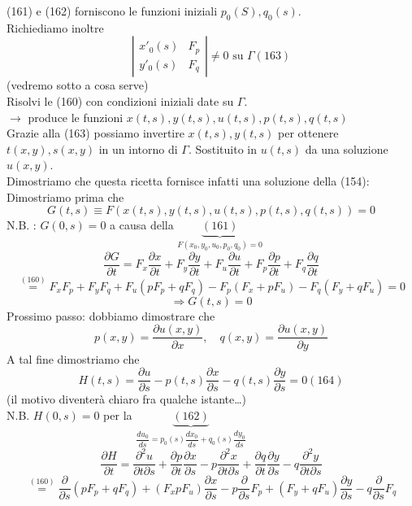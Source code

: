\documentclass[a4paper,11pt]{report}
\begin{document}
(161) e (162) forniscono le funzioni iniziali $p_0(S), q_0(s)$.\\
Richiediamo inoltre
\begin{equation}
\left| \begin{matrix}
x'_0(s) & F_p\\
y'_0(s) & F_q
\end{matrix}\right| \neq 0 \text{ su } \Gamma (163)
\end{equation}
(vedremo sotto a cosa serve)\\
Risolvi le (160) con condizioni iniziali date su $\Gamma$.\\
$\rightarrow$ produce le funzioni $x(t,s), y(t,s), u(t,s), p(t,s), q(t,s)$\\
Grazie alla (163) possiamo invertire $x(t,s), y(t,s)$ per ottenere $t(x,y), s(x,y)$ in un intorno di $\Gamma$. Sostituito in $u(t,s)$ da una soluzione $u(x,y)$.\\
Dimostriamo che questa ricetta fornisce infatti una soluzione della (154):\\
Dimostriamo prima che 
$$
G(t,s) \equiv F(x(t,s),y(t,s),u(t,s),p(t,s),q(t,s))=0
$$
N.B. : $G(0,s)=0$ a causa della $\underset{F(x_0,y_0,u_0,p_0,q_0)=0}{\underbrace{(161)}}$
$$
\dfrac{\partial G}{\partial t} = F_x \dfrac{\partial x}{\partial t} + F_y \dfrac{\partial y}{\partial t} + F_u \dfrac{\partial u}{\partial t} + F_p \dfrac{\partial p}{\partial t} + F_q \dfrac{\partial q}{\partial t}
$$
$$
\overset{(160)}{=}F_xF_p + F_y F_q + F_u(pF_p + qF_q) - F_p(F_x + pF_u) - F_q(F_y + qF_u)=0
$$
$$
\Rightarrow G(t,s)=0
$$
Prossimo passo: dobbiamo dimostrare che 
$$
p(x,y)=\dfrac{\partial u(x,y)}{\partial x}, \quad q(x,y)=\dfrac{\partial u(x,y)}{\partial y}
$$
A tal fine dimostriamo che 
\begin{equation}
H(t,s)=\dfrac{\partial u}{\partial s} - p(t,s)\dfrac{\partial x}{\partial s} - q(t,s) \dfrac{\partial y}{\partial s} =0 (164)
\end{equation}
(il motivo diventerà chiaro fra qualche istante\dots)\\
N.B. $H(0,s)=0$ per la $\underset{\dfrac{du_0}{ds} = p_0(s)\dfrac{dx_0}{ds} + q_0(s) \dfrac{dy_0}{ds}}{\underbrace{(162)}}$
$$
\dfrac{\partial H}{\partial t} = \dfrac{\partial^2 u}{\partial t \partial s} + \dfrac{\partial p}{\partial t}\dfrac{\partial x}{\partial s} - p\dfrac{\partial^2 x}{\partial t \partial s} + \dfrac{\partial q}{\partial t}\dfrac{\partial y}{\partial s} - q\dfrac{\partial^2 y}{\partial t \partial s}
$$
$$
\overset{(160)}{=} \dfrac{\partial}{\partial s}(pF_p + qF_q) + (F_x pF_u)\dfrac{\partial x}{\partial s} - p\dfrac{\partial}{\partial s}F_p + (F_y + qF_u)\dfrac{\partial y}{\partial s} - q \dfrac{\partial}{\partial s} F_q 
$$
\end{document}
